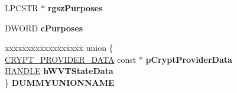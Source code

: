 \begin{DoxyCompactItemize}
\item 
\mbox{\label{structtag_c_r_y_p_t_u_i___v_i_e_w_c_e_r_t_i_f_i_c_a_t_e___s_t_r_u_c_t_a_a13d5b01bbf5ad6dbf1b4f199fd0de1be}} 
L\+P\+C\+S\+TR $\ast$ {\bfseries rgsz\+Purposes}
\item 
\mbox{\label{structtag_c_r_y_p_t_u_i___v_i_e_w_c_e_r_t_i_f_i_c_a_t_e___s_t_r_u_c_t_a_a71a8d9ffa456a8c89383fc563c65fdeb}} 
D\+W\+O\+RD {\bfseries c\+Purposes}
\item 
\mbox{\label{structtag_c_r_y_p_t_u_i___v_i_e_w_c_e_r_t_i_f_i_c_a_t_e___s_t_r_u_c_t_a_a6a8758b392157337193835994ea3957c}} 
\begin{tabbing}
xx\=xx\=xx\=xx\=xx\=xx\=xx\=xx\=xx\=\kill
union \{\\
\>\hyperlink{struct___c_r_y_p_t___p_r_o_v_i_d_e_r___d_a_t_a}{CRYPT\_PROVIDER\_DATA} const  $\ast$ {\bfseries pCryptProviderData}\\
\>\hyperlink{interfacevoid}{HANDLE} {\bfseries hWVTStateData}\\
\} {\bfseries DUMMYUNIONNAME}\\


\end{tabbing}
\end{DoxyCompactItemize}
